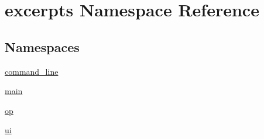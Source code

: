 \hypertarget{namespaceexcerpts}{\section{excerpts Namespace Reference}
\label{namespaceexcerpts}
}
\subsection*{Namespaces}
\begin{DoxyCompactItemize}
\item 
 \hyperlink{namespaceexcerpts_1_1command__line}{command\+\_\+line}
\item 
 \hyperlink{namespaceexcerpts_1_1main}{main}
\item 
 \hyperlink{namespaceexcerpts_1_1op}{op}
\item 
 \hyperlink{namespaceexcerpts_1_1ui}{ui}
\end{DoxyCompactItemize}
